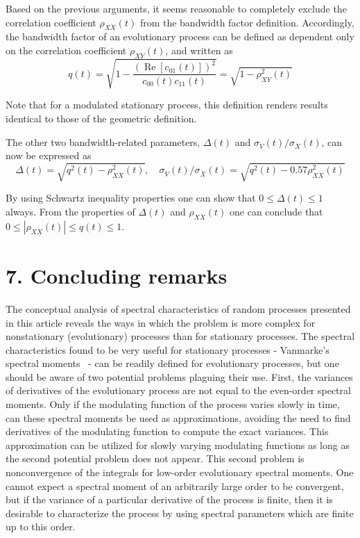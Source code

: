 \documentclass[12pt]{article}
\begin{document}
Based on the previous arguments, it seems reasonable to completely exclude the correlation coefficient $\rho_{X \dot{X}}(t)$ from the bandwidth factor definition. Accordingly, the bandwidth factor of an evolutionary process can be defined as dependent only on the correlation coefficient $\rho_{X \dot{Y}}(t)$, and written as
\begin{equation}
q(t)=\sqrt{1-\frac{\left(\operatorname{Re}\left[c_{01}(t)\right]\right)^{2}}{c_{00}(t) c_{11}(t)}}=\sqrt{1-\rho_{X \dot{Y}}^{2}(t)}
\label{eq:70}
\end{equation}

Note that for a modulated stationary process, this definition renders results identical to those of the geometric definition.

The other two bandwidth-related parameters, $\Delta(t)$ and $\sigma_{\dot{V}}(t) / \sigma_{\dot{X}}(t)$, can now be expressed as
\begin{equation}
\Delta(t)=\sqrt{q^{2}(t)-\rho_{X \dot{X}}^{2}(t)}, \quad \sigma_{\dot{V}}(t) / \sigma_{\dot{X}}(t)=\sqrt{q^{2}(t)-0.57 \rho_{X \dot{X}}^{2}(t)}
\label{eq:71}
\end{equation}

By using Schwartz inequality properties one can show that $0 \leqslant \Delta(t) \leqslant 1$ always. From the properties of $\Delta(t)$ and $\rho_{X \dot{X}}(t)$ one can conclude that $0 \leqslant\left|\rho_{X \dot{X}}(t)\right| \leqslant q(t) \leqslant 1$.

\section*{7. Concluding remarks}

The conceptual analysis of spectral characteristics of random processes presented in this article reveals the ways in which the problem is more complex for nonstationary (evolutionary) processes than for stationary processes. The spectral characteristics found to be very useful for stationary processes - Vanmarke's spectral moments~\cite{Vanmarke1972} - can be readily defined for evolutionary processes, but one should be aware of two potential problems plaguing their use. First, the variances of derivatives of the evolutionary process are not equal to the even-order spectral moments. Only if the modulating function of the process varies slowly in time, can these spectral moments be used as approximations, avoiding the need to find derivatives of the modulating function to compute the exact variances. This approximation can be utilized for slowly varying modulating functions as long as the second potential problem does not appear. This second problem is nonconvergence of the integrals for low-order evolutionary spectral moments. One cannot expect a spectral moment of an arbitrarily large order to be convergent, but if the variance of a particular derivative of the process is finite, then it is desirable to characterize the process by using spectral parameters which are finite up to this order.
\end{document}
